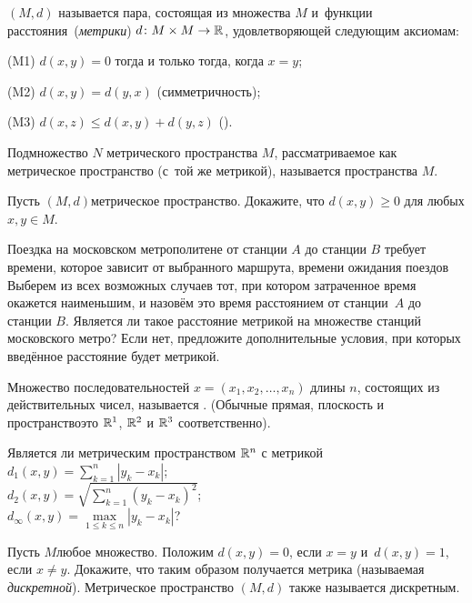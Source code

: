 \documentclass[a4paper,12pt]{article}
\begin{document}

 $(M, d)$ называется пара, состоящая из множества $M$ и~функции  расстояния\ (\emph{метрики}) $d\colon M\times M \rightarrow \mathbb{R}$, удовлетворяющей следующим аксиомам:
\begin{items}{-3}
\item[(M1)]
$d(x,y) = 0$ тогда и только тогда, когда $x=y$;
\item[(M2)]
$d(x,y) = d(y,x)$ ( симметричность);
\item[(M3)]
$d(x,z)\le d(x,y)+d(y,z)$ ().
\end{items}

Подмножество $N$ метрического пространства $M$, рассматриваемое как метрическое пространство (с~той же метрикой), называется  пространства $M$.

Пусть $(M, d)$\т метрическое пространство. Докажите, что $d(x,y)\ge0$ для любых $x,y\in M$.

Поездка на московском метрополитене от станции $A$ до станции $B$ требует времени, которое зависит от выбранного маршрута, времени ожидания поездов
 Выберем из всех возможных случаев тот, при котором затраченное время окажется наименьшим, и назовём это время расстоянием от станции~$A$ до станции $B$. Является ли такое расстояние метрикой на множестве станций московского метро? Если нет, предложите дополнительные условия, при которых введённое
расстояние будет метрикой.

Множество последовательностей $x=(x_1,x_2,\dots,x_n)$ длины $n$, состоящих из действительных чисел, называется . (Обычные прямая, плоскость и пространство\т это $\mathbb{R}^1$,
$\mathbb{R}^2$ и $\mathbb{R}^3$ соответственно).

\label{R^n}
Является ли метрическим пространством $\mathbb{R}^n$ с метрикой\\
$d_1(x,y)=\sum\limits_{k=1}^{n}|y_k-x_k|$;\\
$d_2(x,y)=\sqrt{\sum\limits_{k=1}^{n}(y_k-x_k)^2}$;\\
$d_\infty(x,y)=\max\limits_{1\le k\le n}|y_k-x_k|$?

Пусть $M$\т любое множество. Положим $d(x,y)=0$, если $x=y$ и~$d(x,y)=1$, если $x\ne y$. Докажите, что таким образом получается метрика (называемая \emph{дискретной}). Метрическое пространство $(M, d)$ также называется  дискретным.
\end{document}
